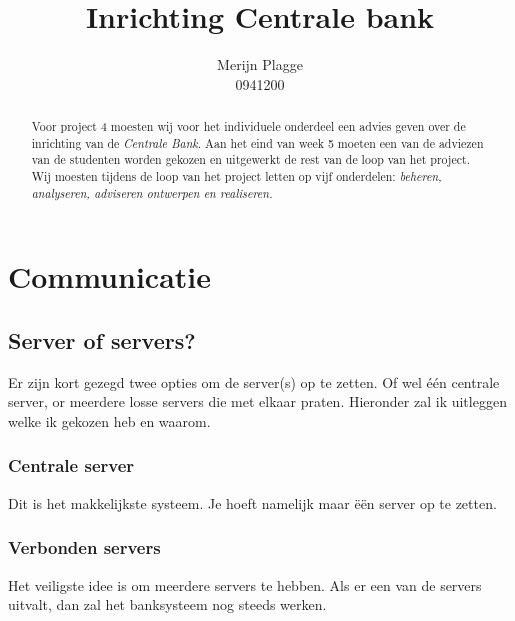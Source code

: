 \documentclass{article}
\begin{document}
\title{\huge{Inrichting Centrale bank} }
\author{Merijn Plagge \\ 0941200}

\maketitle

\begin{abstract}

Voor project 4 moesten wij voor het individuele onderdeel een advies geven over de inrichting van de \emph{Centrale Bank}.
Aan het eind van week 5 moeten een van de adviezen van de studenten worden gekozen en uitgewerkt de rest van de loop van het project.
Wij moesten tijdens de loop van het project letten op vijf onderdelen: \emph{beheren, analyseren, adviseren ontwerpen en realiseren.}

\end{abstract}

\newpage

\tableofcontents

\newpage

\section{Communicatie}

\subsection{Server of servers?} 

Er zijn kort gezegd twee opties om de server(s) op te zetten.
Of wel \'e\'en centrale server, or meerdere losse servers die met elkaar praten.
Hieronder zal ik uitleggen welke ik gekozen heb en waarom.


\subsubsection{Centrale server}

Dit is het makkelijkste systeem.
Je hoeft namelijk maar \"e\"en server op te zetten.

\subsubsection{Verbonden servers}

Het veiligste idee is om meerdere servers te hebben.
Als er een van de servers uitvalt, dan zal het banksysteem nog steeds werken.
\end{document}
